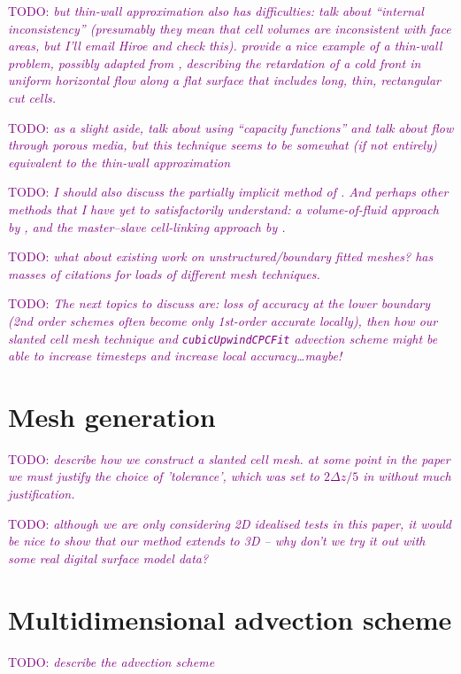\documentclass{article}
\newcommand{\TODO}[1]{\textcolor{purple}{TODO: \emph{#1}}}
\begin{document}
\TODO{but thin-wall approximation also has difficulties: \citet{yamazaki-satomura2010} talk about ``internal inconsistency'' (presumably they mean that cell volumes are inconsistent with face areas, but I'll email Hiroe and check this).  \citet{walko-avissar2008b} provide a nice example of a thin-wall problem, possibly adapted from \citet{calhoun-leveque2000}, describing the retardation of a cold front in uniform horizontal flow along a flat surface that includes long, thin, rectangular cut cells.}

\TODO{as a slight aside, \citet{calhoun-leveque2000} talk about using ``capacity functions'' and talk about flow through porous media, but this technique seems to be somewhat (if not entirely) equivalent to the thin-wall approximation}

\TODO{I should also discuss the partially implicit method of \citet{jebens2011}.  And perhaps other methods that I have yet to satisfactorily understand: a volume-of-fluid approach by \citet{almgren1997}, and the master--slave cell-linking approach by \citet{kirkpatrick2003}.}

\TODO{what about existing work on unstructured/boundary fitted meshes?  \citet{almgren1997} has masses of citations for loads of different mesh techniques.}

\vspace*{2em}


\TODO{The next topics to discuss are: loss of accuracy at the lower boundary (2nd order schemes often become only 1st-order accurate locally), then how our slanted cell mesh technique and \texttt{cubicUpwindCPCFit} advection scheme might be able to increase timesteps and increase local accuracy\ldots maybe!}

\section{Mesh generation}
\TODO{describe how we construct a slanted cell mesh.  at some point in the paper we must justify the choice of 'tolerance', which was set to $2\Delta z/5$ in \citet{shaw-weller2016} without much justification.}

\TODO{although we are only considering 2D idealised tests in this paper, it would be nice to show that our method extends to 3D -- why don't we try it out with some real digital surface model data?}

\section{Multidimensional advection scheme}
\TODO{describe the advection scheme}
\end{document}

